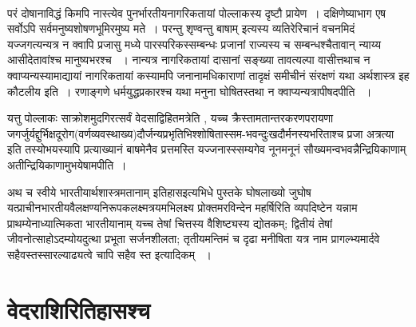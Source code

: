 \begin{myquote}

~\hfill {}
\end{myquote}

परं दोषानाविद्धं किमपि नास्त्येव पुनर्भारतीयनागरिकतायां पोल्लाकस्य दृष्टौ प्रायेण~। दक्षिणेष्याभाग एष सर्वोऽपि सर्वमनुष्यशोषणभूमिरमुष्य मते~। परन्तु शृण्वन्तु बाषाम्  इत्यस्य व्यतिरेरिचानं वचनमिदं यज्जगत्यन्यत्र न क्वापि प्रजासु मध्ये पारस्परिकस्सम्बन्धः प्रजानां राज्यस्य च सम्बन्धश्चैतावान् न्याय्य आसीदेतावांश्च मानुष्यभरश्च ~। नान्यत्र नागरिकतायां दासानां सङ्ख्या तावत्यल्पा वासीत्तथाच न क्वाप्यन्यस्यामाद्यायां नागरिकतायां कस्यामपि जनानामधिकाराणां  तादृक्षं समीचीनं संरक्षणं यथा अर्थशास्त्र इह कौटलीय इति~। रणाङ्गणे धर्मयुद्धप्रकारश्च यथा मनुना घोषितस्तथा न क्वाप्यन्यत्रापीषदपीति ~।

यत्तु पोल्लाकः साक्रोशमुदगिरत्सर्वं वेदसाद्विहितमत्रेति , यच्च क्रैस्ता\break मतान्तरकरणपरायणा जगर्जुर्यद्दुर्भिक्षदूरोग(वर्णव्यवस्थाख्य)दौर्जन्यप्रभृतिभिश्शोषितास्सम-\break\-भवन्दुःखदौर्मनस्यभरिताश्च प्रजा अत्रत्या इति तस्योभयस्यापि प्रत्याख्यानं बाषमेनैव प्रत्तमस्ति  यज्जनास्स्सम्यगेव नूनमनूनं सौख्यमन्वभवन्नैन्द्रियिकाणाम् अतीन्द्रियिकाणामुभयेषामपीति~।

अथ च स्वीये भारतीयार्थशास्त्रमतानाम् इतिहास\break इत्यभिधे पुस्तके घोषलाख्यो जुघोष यत्प्राचीनभारतीयवैलक्षण्यनिरूपकलक्ष्मत्रयमभिलक्ष्य प्रोक्तमरविन्देन महर्षिरिति व्यपदिष्टेन  यन्नाम प्राथम्येना\-ध्यात्मि\-कता भारतीयानाम् यच्च तेषां चित्तस्य वैशिष्ट्यस्य द्योतकम्; द्वितीयं तेषां जीवनोत्साहोऽदम्यो\break यदुत्था प्रभूता सर्जनशीलता; तृतीयमन्तिमं च दृढा मनीषिता यत्र नाम प्रागल्भ्यमार्दवे सहैव\break स्तस्सारल्याढ्यत्वे चापि सहैव स्त इत्यादिकम् ~।

\section*{वेदराशिरितिहासश्च}

